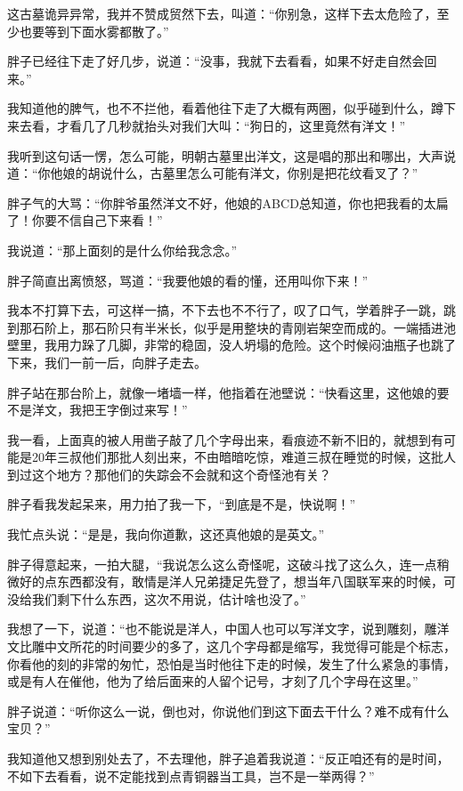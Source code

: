 这古墓诡异异常，我并不赞成贸然下去，叫道：“你别急，这样下去太危险了，至少也要等到下面水雾都散了。”

胖子已经往下走了好几步，说道：“没事，我就下去看看，如果不好走自然会回来。”

我知道他的脾气，也不不拦他，看着他往下走了大概有两圈，似乎碰到什么，蹲下来去看，才看几了几秒就抬头对我们大叫：“狗日的，这里竟然有洋文！”

我听到这句话一愣，怎么可能，明朝古墓里出洋文，这是唱的那出和哪出，大声说道：“你他娘的胡说什么，古墓里怎么可能有洋文，你别是把花纹看叉了？”

胖子气的大骂：“你胖爷虽然洋文不好，他娘的ABCD总知道，你也把我看的太扁了！你要不信自己下来看！”

我说道：“那上面刻的是什么你给我念念。”

胖子简直出离愤怒，骂道：“我要他娘的看的懂，还用叫你下来！”

我本不打算下去，可这样一搞，不下去也不不行了，叹了口气，学着胖子一跳，跳到那石阶上，那石阶只有半米长，似乎是用整块的青刚岩架空而成的。一端插进池壁里，我用力跺了几脚，非常的稳固，没人坍塌的危险。这个时候闷油瓶子也跳了下来，我们一前一后，向胖子走去。

胖子站在那台阶上，就像一堵墙一样，他指着在池壁说：“快看这里，这他娘的要不是洋文，我把王字倒过来写！”

我一看，上面真的被人用凿子敲了几个字母出来，看痕迹不新不旧的，就想到有可能是20年三叔他们那批人刻出来，不由暗暗吃惊，难道三叔在睡觉的时候，这批人到过这个地方？那他们的失踪会不会就和这个奇怪池有关？

胖子看我发起呆来，用力拍了我一下，“到底是不是，快说啊！”

我忙点头说：“是是，我向你道歉，这还真他娘的是英文。”

胖子得意起来，一拍大腿，“我说怎么这么奇怪呢，这破斗找了这么久，连一点稍微好的点东西都没有，敢情是洋人兄弟捷足先登了，想当年八国联军来的时候，可没给我们剩下什么东西，这次不用说，估计啥也没了。”

我想了一下，说道：“也不能说是洋人，中国人也可以写洋文字，说到雕刻，雕洋文比雕中文所花的时间要少的多了，这几个字母都是缩写，我觉得可能是个标志，你看他的刻的非常的匆忙，恐怕是当时他往下走的时候，发生了什么紧急的事情，或是有人在催他，他为了给后面来的人留个记号，才刻了几个字母在这里。”

胖子说道：“听你这么一说，倒也对，你说他们到这下面去干什么？难不成有什么宝贝？”

我知道他又想到别处去了，不去理他，胖子追着我说道：“反正咱还有的是时间，不如下去看看，说不定能找到点青铜器当工具，岂不是一举两得？”

